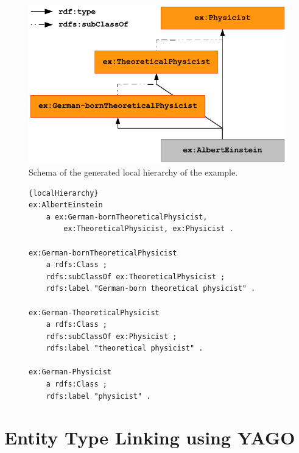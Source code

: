 \begin{figure}[tb!]
\centering
\includegraphics[scale=0.7]{part_02/unstructured_annotation/fig/localHierarchy.pdf}
\caption{Schema of the generated local hierarchy of the example.}
\label{fig:localHierarchy}
\end{figure}

\begin{figure}
\begin{lstlisting}[label=lst:localHierarchy,caption=The local hierarchy is generated from the extracted string expressed using turtle.]{localHierarchy}
ex:AlbertEinstein
    a ex:German-bornTheoreticalPhysicist, 
        ex:TheoreticalPhysicist, ex:Physicist .

ex:German-bornTheoreticalPhysicist
    a rdfs:Class ;
    rdfs:subClassOf ex:TheoreticalPhysicist ;
    rdfs:label "German-born theoretical physicist" .

ex:German-TheoreticalPhysicist
    a rdfs:Class ;
    rdfs:subClassOf ex:Physicist ;
    rdfs:label "theoretical physicist" .

ex:German-Physicist
    a rdfs:Class ;
    rdfs:label "physicist" .

\end{lstlisting}
\end{figure}

\section{Entity Type Linking using YAGO}
\label{sec:linkingyago}


